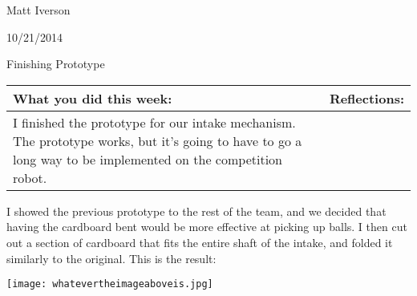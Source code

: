 Matt Iverson

10/21/2014

Finishing Prototype

\begin{tabular}{|p{5cm}|p{5cm}|}
 \hline
 What you did this week: &
 Reflections: \\
 \hline
 I finished the prototype for our intake mechanism.
 The prototype works, but it’s going to have to go a long way to be implemented on the competition robot.\\
 \hline
\end{tabular}

I showed the previous prototype to the rest of the team, and we decided that having the cardboard bent would be more effective at picking up balls. I then cut out a section of cardboard that fits the entire shaft of the intake, and folded it similarly to the original. This is the result: 

\texttt{[image: whatevertheimageaboveis.jpg]}

